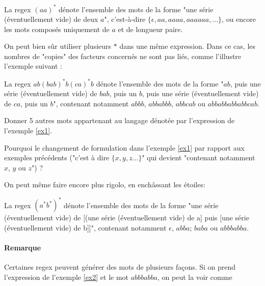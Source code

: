\begin{example}
La regex $(aa)^*$ dénote l'ensemble des mots de la forme "une série (éventuellement vide) de deux $a$", c'est-à-dire $\{\epsilon, aa, aaaa, aaaaaa, ...\}$, ou encore les mots composés uniquement de $a$ et de longueur paire.
\end{example}

On peut bien sûr utiliser plusieurs $*$ dans une même expression. Dans ce cas, les nombres de "copies" des facteurs concernés ne sont pas liés, comme l'illustre l'exemple suivant :

\begin{example}
\label{ex1}
La regex $ab(bab)^*b(ca)^*b$ dénote l'ensemble des mots de la forme "$ab$, puis une série (éventuellement vide) de $bab$, puis un $b$, puis une série (éventuellement vide) de $ca$, puis un $b$", contenant notamment $abbb$, $abbabbb$, $abbcab$ ou $abbabbabbabbcab$.
\end{example}

\begin{exercice}
Donner 5 autres mots appartenant au langage dénotée par l'expression de l'exemple \ref{ex1}. 
\end{exercice}

\begin{exercice}
Pourquoi le changement de formulation dans l'exemple \ref{ex1} par rapport aux exemples précédents ("c'est à dire $\{x, y, z ... \}$" qui devient "contenant notamment $x$, $y$ ou $z$") ?
\end{exercice}

On peut même faire encore plus rigolo, en enchâssant les étoiles:


\begin{example}
\label{ex2}
La regex $(a^*b^*)^*$ dénote l'ensemble des mots de la forme "une série (éventuellement vide) de [(une série (éventuellement vide) de a] puis [une série (éventuellement vide) de b]]", contenant notamment $\epsilon$, $abba$; $baba$ ou $abbbabba$. 
\end{example}

\paragraph{Remarque} Certaines regex peuvent générer des mots de plusieurs façons. Si on prend l'expression de l'exemple \ref{ex2} et le mot $abbbabba$, on peut la voir comme 

